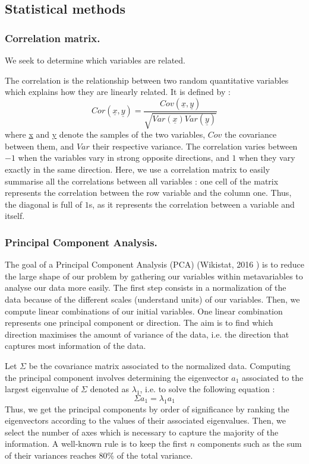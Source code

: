 \subsection{Statistical methods}

\subsubsection{Correlation matrix.}

We seek to determine which variables are related. 

The correlation is the relationship between two random quantitative variables which explains how they are linearly related. It is defined by :
\begin{equation}
    Cor(\underline{x},\underline{y}) = \frac{Cov(\underline{x},\underline{y})}{\sqrt{Var(\underline{x})Var(\underline{y})}}
\end{equation}
where \underline{x} and \underline{y} denote the samples of the two variables, $Cov$ the covariance between them, and $Var$ their respective variance. The correlation varies between $-1$ when the variables vary in strong opposite directions, and $1$ when they vary exactly in the same direction. Here, we use a correlation matrix to easily summarise all the correlations between all variables : one cell of the matrix represents the correlation between the row variable and the column one. Thus, the diagonal is full of $1$s, as it represents the correlation between a variable and itself.\newline

\subsubsection{Principal Component Analysis.}

The goal of  a Principal Component Analysis (PCA) (Wikistat, 2016 \cite{ACP}) is to reduce the large shape of our problem by gathering our variables within metavariables to analyse our data more easily. The first step consists in a normalization of the data because of the different scales (understand units) of our variables. Then, we compute linear combinations of our initial variables. One linear combination represents one principal component or direction. The aim is to find which direction maximises the amount of variance of the data, i.e. the direction that captures most information of the data. 

Let $\Sigma$ be the covariance matrix associated to the normalized data. Computing the principal component involves determining the eigenvector $a_1$ associated to the largest eigenvalue of $\Sigma$ denoted as $\lambda_1$, i.e. to solve the following equation :
\begin{equation}
    \Sigma a_1 = \lambda_1 a_1
\end{equation}
Thus, we get the principal components by order of significance by ranking the eigenvectors according to the values of their associated eigenvalues. Then, we select the number of axes which is necessary to capture the majority of the information. A well-known rule is to keep the first $n$ components such as the sum of their variances reaches $80\%$ of the total variance.

